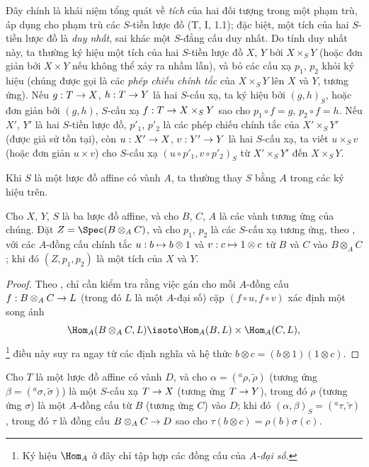 \documentclass[oneside]{amsart}
\makeatletter
\newcommand{\ega@arrow}[2]{\mathchoice{#1}{#2}{#2}{#2}}
\let\ega@shortmapsto\mapsto
\renewcommand{\to}{\ega@arrow{\longrightarrow}{\rightarrow}}
\renewcommand{\mapsto}{\ega@arrow{\longmapsto}{\ega@shortmapsto}}
\let\EGAOriginalLabel\label
\renewcommand{\label}[1]{\phantomsection\EGAOriginalLabel{#1}}
\makeatother
\begin{document}
Đây chính là khái niệm tổng quát về \emph{tích} của hai đối tượng trong một
phạm trù, áp dụng cho phạm trù các $S$-tiền lược đồ (T, I, 1.1); đặc biệt,
một tích của hai $S$-tiền lược đồ là \emph{duy nhất}, sai khác một
$S$-đẳng cấu duy nhất. Do tính duy nhất này, ta thường ký hiệu một tích của
hai $S$-tiền lược đồ $X$, $Y$ bởi $X\times_S Y$ (hoặc đơn giản bởi
$X\times Y$ nếu không thể xảy ra nhầm lẫn), và bỏ các cấu xạ $p_1$, $p_2$
khỏi ký hiệu (chúng được gọi là các \emph{phép chiếu chính tắc} của
$X\times_S Y$ lên $X$ và $Y$, tương ứng). Nếu $g:T\to X$, $h:T\to Y$ là hai
$S$-cấu xạ, ta ký hiệu bởi $(g,h)_S$, hoặc đơn giản bởi $(g,h)$, $S$-cấu xạ
$f:T\to X\times_S Y$ sao cho $p_1\circ f=g$, $p_2\circ f=h$. Nếu $X'$, $Y'$
là hai $S$-tiền lược đồ, $p'_1$, $p'_2$ là các phép chiếu chính tắc của
$X'\times_S Y'$ (được giả sử tồn tại), còn $u:X'\to X$, $v:Y'\to Y$ là hai
$S$-cấu xạ, ta viết $u\times_S v$ (hoặc đơn giản $u\times v$) cho
$S$-cấu xạ $(u\circ p'_1,v\circ p'_2)_S$ từ $X'\times_S Y'$ đến
$X\times_S Y$.

Khi $S$ là một lược đồ affine có vành $A$, ta thường thay $S$ bằng $A$ trong
các ký hiệu trên.

\begin{proposition}[3.2.2]
\label{I.3.2.2}
Cho $X$, $Y$, $S$ là ba lược đồ affine, và cho $B$, $C$, $A$ là các vành
tương ứng của chúng. Đặt $Z=\Spec(B\otimes_A C)$, và cho $p_1$, $p_2$ là các
$S$-cấu xạ tương ứng, theo , với các $A$-đồng cấu chính tắc
$u:b\mapsto b\otimes1$ và $v:c\mapsto1\otimes c$ từ $B$ và $C$ vào
$B\otimes_A C$; khi đó $(Z,p_1,p_2)$ là một tích của $X$ và $Y$.
\end{proposition}

\begin{proof}
Theo , chỉ cần kiểm tra rằng việc gán cho mỗi $A$-đồng cấu
$f:B\otimes_A C\to L$ (trong đó $L$ là một $A$-đại số) cặp
$(f\circ u,f\circ v)$ xác định một song ánh
\[
  \Hom_A(B\otimes_A C,L)\isoto
  \Hom_A(B,L)\times\Hom_A(C,L),
\]\footnote{Ký hiệu $\Hom_A$ ở đây chỉ tập hợp các đồng cấu của
\emph{$A$-đại số}.} điều này suy ra ngay từ các định nghĩa và hệ thức
$b\otimes c=(b\otimes1)(1\otimes c)$.
\end{proof}

\begin{corollary}[3.2.3]
\label{I.3.2.3}
Cho $T$ là một lược đồ affine có vành $D$, và cho
$\alpha=({}^a\rho,\widetilde{\rho})$ (tương ứng
$\beta=({}^a\sigma,\widetilde{\sigma})$) là một $S$-cấu xạ $T\to X$ (tương
ứng $T\to Y$), trong đó $\rho$ (tương ứng $\sigma$) là một $A$-đồng cấu từ
$B$ (tương ứng $C$) vào $D$; khi đó
$(\alpha,\beta)_S=({}^a\tau,\widetilde{\tau})$, trong đó $\tau$ là đồng cấu
$B\otimes_A C\to D$ sao cho $\tau(b\otimes c)=\rho(b)\sigma(c)$.
\end{corollary}
\end{document}
